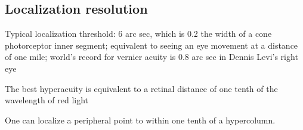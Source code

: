 \subsection*{Localization resolution}

 \be

  \item Typical localization threshold: 6 arc sec, which is 0.2 the width of
a cone photorceptor inner segment; equivalent to seeing an eye
movement at a distance of one mile; world's record for vernier acuity
is 0.8 arc sec in Dennis Levi's right eye

\item The best hyperacuity is equivalent to a retinal distance of one
tenth of the  wavelength of red light

\item One can localize a peripheral point to within one tenth of a
hypercolumn. 

 \ee

